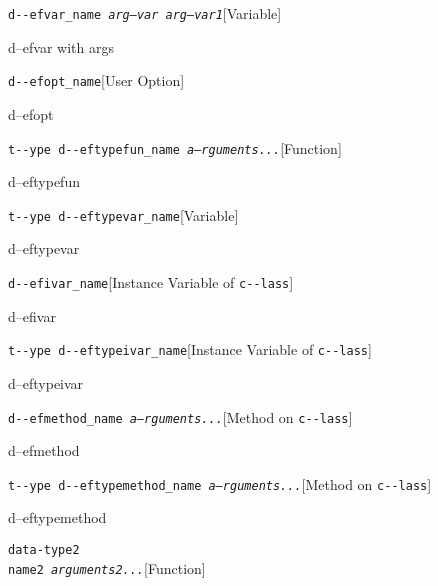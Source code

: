 \documentclass{book}
\begin{document}
\noindent\texttt{d{-}{-}efvar\_name \bgroup{}\normalfont{}\textsl{arg--var arg--var1}\egroup{}}\hfill[Variable]



%
d--efvar with args

\noindent\texttt{d{-}{-}efopt\_name}\hfill[User Option]



%
d--efopt

\noindent\texttt{t{-}{-}ype d{-}{-}eftypefun\_name \bgroup{}\normalfont{}\textsl{a--rguments...}\egroup{}}\hfill[Function]



%
d--eftypefun

\noindent\texttt{t{-}{-}ype d{-}{-}eftypevar\_name}\hfill[Variable]



%
d--eftypevar

\noindent\texttt{d{-}{-}efivar\_name}\hfill[Instance Variable of \texttt{c{-}{-}lass}]



%
d--efivar

\noindent\texttt{t{-}{-}ype d{-}{-}eftypeivar\_name}\hfill[Instance Variable of \texttt{c{-}{-}lass}]



%
d--eftypeivar

\noindent\texttt{d{-}{-}efmethod\_name \bgroup{}\normalfont{}\textsl{a--rguments...}\egroup{}}\hfill[Method on \texttt{c{-}{-}lass}]



%
d--efmethod

\noindent\texttt{t{-}{-}ype d{-}{-}eftypemethod\_name \bgroup{}\normalfont{}\textsl{a--rguments...}\egroup{}}\hfill[Method on \texttt{c{-}{-}lass}]



%
d--eftypemethod


\noindent\texttt{data-type2\leavevmode{}\\name2 \bgroup{}\normalfont{}\textsl{arguments2...}\egroup{}}\hfill[Function]
\end{document}
